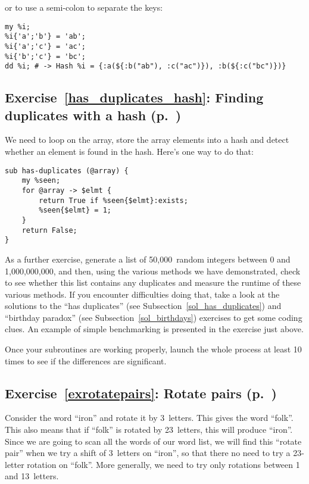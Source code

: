 or to use a semi-colon to separate the keys:

\begin{verbatim}
my %i;
%i{'a';'b'} = 'ab';
%i{'a';'c'} = 'ac';
%i{'b';'c'} = 'bc';
dd %i; # -> Hash %i = {:a(${:b("ab"), :c("ac")}), :b(${:c("bc")})}
\end{verbatim}
%

\subsection{Exercise~\ref{has_duplicates_hash}: Finding duplicates with a hash (p.~\pageref{has_duplicates_hash})}
\label{sol_has_duplicates_hash}

We need to loop on the array, store the array elements into 
a hash and detect whether an element is found in the hash. 
Here's one way to do that:

\begin{verbatim}
sub has-duplicates (@array) {
    my %seen;
    for @array -> $elmt {
        return True if %seen{$elmt}:exists;
        %seen{$elmt} = 1;
    }
    return False;
}
\end{verbatim}

As a further exercise, generate a list of 50,000~random 
integers between 0 and 1,000,000,000, and then, using 
the various methods we have demonstrated, check to see 
whether this list contains any duplicates and measure the 
runtime of these various methods. If you encounter difficulties doing 
that, take a look at the solutions to the ``has duplicates'' 
(see Subsection~\ref{sol_has_duplicates}) and ``birthday paradox'' (see 
Subsection~\ref{sol_birthdays}) exercises to get some coding clues. An 
example of simple benchmarking is presented in the exercise just 
above.

Once your subroutines are working properly, launch the 
whole process at least 10 times to see if the differences 
are significant.

\subsection{Exercise~\ref{exrotatepairs}: Rotate pairs (p.~\pageref{exrotatepairs})}
\label{sol_exrotatepairs}

Consider the word ``iron'' and rotate it by 3~letters. This 
gives the word ``folk''. This also means that if ``folk'' 
is rotated by 23~letters, this will produce ``iron''. Since 
we are going to scan all the words of our word list, we will 
find this ``rotate pair'' when we try a shift of 3~letters 
on ``iron'', so that there no need to try a 23-letter rotation 
on ``folk''. More generally, we need to try only rotations 
between 1 and 13~letters. 

